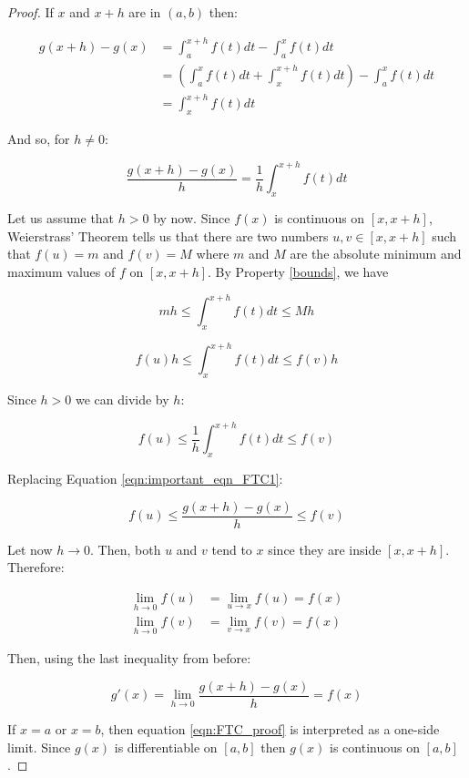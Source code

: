 \documentclass[a4paper,11pt]{article}
\theoremstyle{definition}
\theoremstyle{plain}
\begin{document}
\begin{proof}
If \(x\) and \(x+h\) are in \((a,b)\) then:

\begin{align*}
g(x+h) - g(x) &= \int^{x+h}_a f(t) dt - \int^x_a f(t) dt \\
&= \left(\int_a^x f(t) dt + \int_x^{x+h} f(t)dt\right) - \int^x_a f(t) dt \\
&= \int_x^{x+h} f(t)dt 
\end{align*}

And so, for \(h\neq 0\):

\begin{equation}
\frac{g(x+h)-g(x)}{h} = \frac{1}{h}\int_x^{x+h} f(t) dt
\label{eqn:important_eqn_FTC1}
\end{equation}

Let us assume that \(h>0\) by now. Since \(f(x)\) is continuous on \([x,x+h]\), Weierstrass' Theorem tells us that there are two numbers \(u,v\in[x,x+h]\) such that \(f(u) = m\) and \(f(v) = M\) where \(m\) and \(M\) are the absolute minimum and maximum values of \(f\) on \([x,x+h]\). By Property \ref{bounds}, we have

\[
mh \leq \int^{x+h}_x f(t) dt \leq Mh
\]

\[
f(u)h \leq \int^{x+h}_x f(t) dt \leq f(v) h
\]

Since \(h>0\) we can divide by \(h\):

\[
f(u) \leq \frac{1}{h}\int^{x+h}_{x}f(t) dt \leq f(v)
\]

Replacing Equation \eqref{eqn:important_eqn_FTC1}:

\[
f(u) \leq \frac{g(x+h)-g(x)}{h} \leq f(v)
\]

Let now \(h\rightarrow 0\). Then, both \(u\) and \(v\) tend to \(x\) since they are inside \([x,x+h]\). Therefore:

\begin{align*}
\lim_{h\rightarrow 0} f(u) &= \lim_{u\rightarrow x} f(u) = f(x) \\
\lim_{h\rightarrow 0} f(v) &= \lim_{v\rightarrow x} f(v) = f(x) 
\end{align*}

Then, using the last inequality from before:

\begin{equation}
g'(x) = \lim_{h\rightarrow 0} \frac{g(x+h)-g(x)}{h} = f(x)
\label{eqn:FTC_proof}
\end{equation}

If \(x = a\) or \(x = b\), then equation \eqref{eqn:FTC_proof} is interpreted as a one-side limit. Since \(g(x)\) is differentiable on \([a,b]\) then \(g(x)\) is continuous on \([a,b]\).
\end{proof}
\end{document}
